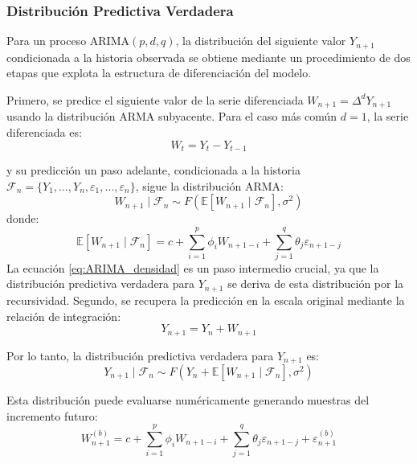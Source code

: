 \subsubsection{Distribución Predictiva Verdadera}

Para un proceso ARIMA$(p,d,q)$, la distribución del siguiente valor $Y_{n+1}$ condicionada a la historia observada se obtiene mediante un procedimiento de dos etapas que explota la estructura de diferenciación del modelo.

Primero, se predice el siguiente valor de la serie diferenciada $W_{n+1} = \Delta^d Y_{n+1}$ usando la distribución ARMA subyacente. Para el caso más común $d=1$, la serie diferenciada es:
\begin{equation}
W_t = Y_t - Y_{t-1}
\end{equation}

y su predicción un paso adelante, condicionada a la historia $\mathcal{F}_n = \{Y_1, \ldots, Y_n, \varepsilon_1, \ldots, \varepsilon_n\}$, sigue la distribución ARMA:
\begin{equation}
    \label{eq:ARIMA_densidad}
W_{n+1} \mid \mathcal{F}_n \sim F\left(\mathbb{E}[W_{n+1} \mid \mathcal{F}_n], \sigma^2\right)
\end{equation}
donde:
\begin{equation}
\mathbb{E}[W_{n+1} \mid \mathcal{F}_n] = c + \sum_{i=1}^p \phi_i W_{n+1-i} + \sum_{j=1}^q \theta_j \varepsilon_{n+1-j}
\label{eq:arima_diff_conditional_mean}
\end{equation}
La ecuación \ref{eq:ARIMA_densidad} es un paso intermedio crucial, ya que la distribución predictiva verdadera para $Y_{n+1}$ se deriva de esta distribución por la recursividad.
Segundo, se recupera la predicción en la escala original mediante la relación de integración:
\begin{equation}
Y_{n+1} = Y_n + W_{n+1}
\label{eq:arima_integration}
\end{equation}

Por lo tanto, la distribución predictiva verdadera para $Y_{n+1}$ es:
\begin{equation}
Y_{n+1} \mid \mathcal{F}_n \sim F\left(Y_n + \mathbb{E}[W_{n+1} \mid \mathcal{F}_n], \sigma^2\right)
\label{eq:arima_predictive_distribution}
\end{equation}

Esta distribución puede evaluarse numéricamente generando muestras del incremento futuro:
\begin{equation}
W_{n+1}^{(b)} = c + \sum_{i=1}^p \phi_i W_{n+1-i} + \sum_{j=1}^q \theta_j \varepsilon_{n+1-j} + \varepsilon_{n+1}^{(b)}
\label{eq:arima_diff_samples}
\end{equation}

